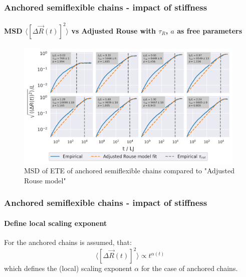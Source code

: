 \documentclass[handout]{beamer}
\newcommand{\mean}[1]{\langle #1 \rangle}
\begin{document}

\begin{frame}
    \frametitle{Anchored semiflexible chains - impact of stiffness}
    \framesubtitle{MSD $\mean{[\Delta \vec{R}(t)]^2}$ vs Adjusted Rouse with $\tau_R$, $a$ as free parameters}
    \begin{figure}[h]
        \includegraphics[width=11cm]{4-exp-delta_R-rouse_fit-tau-a_log.png}
        \caption{MSD of ETE of anchored semiflexible chains compared to 
        "Adjusted Rouse model"}
    \end{figure}
\end{frame}


\begin{frame}
    \frametitle{Anchored semiflexible chains - impact of stiffness}
    \framesubtitle{Define local scaling exponent}
    For the anchored chains is assumed, that:
    $$\mean{[\Delta \vec{R}(t)]^2} \propto t^{\alpha(t)}$$
    which defines the (local) scaling exponent $\alpha$
    for the case of anchored chains.
    

\end{frame}

\end{document}
